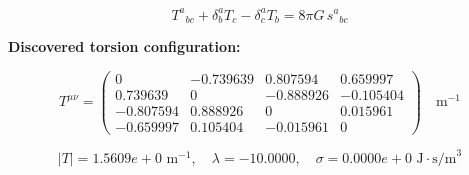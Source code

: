 
\begin{equation}
  T^a{}_{bc} + \delta^a_b T_c - \delta^a_c T_b = 8\pi G \, s^a{}_{bc}
\end{equation}

\textbf{Discovered torsion configuration:}

\begin{equation}
  T^{\mu\nu} = \begin{pmatrix}
    0 & -0.739639 & 0.807594 & 0.659997 \\
    0.739639 & 0 & -0.888926 & -0.105404 \\
    -0.807594 & 0.888926 & 0 & 0.015961 \\
    -0.659997 & 0.105404 & -0.015961 & 0
  \end{pmatrix} \quad \text{m}^{-1}
\end{equation}

\begin{equation}
  |T| = 1.5609e+0 \text{ m}^{-1}, \quad
  \lambda = -10.0000, \quad
  \sigma = 0.0000e+0 \text{ J}\cdot\text{s/m}^3
\end{equation}